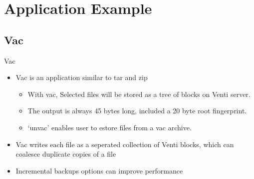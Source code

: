 \section{Application Example}\label{application-example}

\subsection{Vac}

\begin{frame}{Vac}

\begin{itemize}
\itemsep1pt\parskip0pt
\item
  Vac is an application similar to tar and zip

  \begin{itemize}
  \itemsep1pt\parskip0pt
  \item
    With vac, Selected files will be stored as a tree of blocks on Venti
    server.
  \item
    The output is always 45 bytes long, included a 20 byte root
    fingerprint.
  \item
    `unvac' enables user to estore files from a vac archive.
  \end{itemize}
\item
  Vac writes each file as a seperated collection of Venti blocks, which
  can coalesce duplicate copies of a file
\item
  Incremental backups options can improve performance
\end{itemize}

\end{frame}
